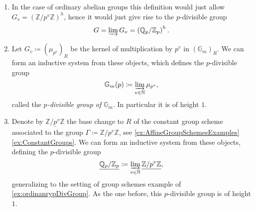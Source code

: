 \begin{ex}\leavevmode\vspace{-.2\baselineskip}\label{ex:pDivGroups}
\begin{enumerate}
\item In the case of ordinary abelian groups this definition would\label{ex:ordinanrypDivGroup}
	just allow
	$G_v = \left( \mathbb{Z}/p^v\mathbb{Z} \right)^h$, hence
	it would just give rise to the $p$-divisible group
	\begin{equation*}
		G = \varinjlim G_v = \left( \mathbb{Q}_p / \mathbb{Z}_p \right)^h
	.\end{equation*} 

\item Let $G_v \coloneqq (\mu_{p^v})_R$ be the kernel of
	multiplication by $p^v$ in $(\mathbb{G}_m)_R$.
	We can form an inductive system from these objects, which defines
	the $p$-divisible group
	\begin{equation*}
		\mathbb{G}_m(p) \coloneqq \varinjlim_{v \in \mathbb{N}}
		\mu_{p^v}
	,\end{equation*}
	called the {\em $p$-divisible group of $\mathbb{G}_m$}.
	In particular it is of height $1$.

\item Denote by $\underline{\mathbb{Z}/p^v\mathbb{Z}}$ the base change to $R$\label{ex:Qp/Zp}
	of the constant group scheme associated
	to the group $\Gamma \coloneqq \mathbb{Z}/p^v\mathbb{Z}$, see \cref{ex:AffineGroupSchemesExamples}
	\cref{ex:ConstantGroups}.
	We can form an inductive system from these objects, defining the $p$-divisible group
	\begin{equation*}
	\underline{\mathbb{Q}_p/\mathbb{Z}_{p}} \coloneqq \varinjlim_{v \in \mathbb{N}}
	\underline{\mathbb{Z}/p^v\mathbb{Z}}
	,\end{equation*}
	generalizing to the setting of group schemes example of \cref{ex:ordinanrypDivGroup}.
	As the one before, this $p$-divisible group is of height $1$.
	

\end{enumerate}
\end{ex}
